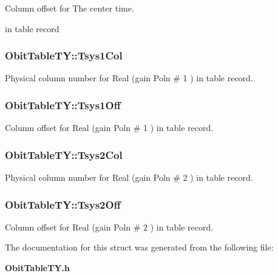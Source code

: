 Column offset for The center time. 

in table record 
\subsubsection{ {\bf Obit\-Table\-TY::Tsys1Col}}\label{structObitTableTY_o31}


Physical column number for Real (gain Poln \# 1 ) in table record. 

\subsubsection{ {\bf Obit\-Table\-TY::Tsys1Off}}\label{structObitTableTY_o30}


Column offset for Real (gain Poln \# 1 ) in table record. 

\subsubsection{ {\bf Obit\-Table\-TY::Tsys2Col}}\label{structObitTableTY_o35}


Physical column number for Real (gain Poln \# 2 ) in table record. 

\subsubsection{ {\bf Obit\-Table\-TY::Tsys2Off}}\label{structObitTableTY_o34}


Column offset for Real (gain Poln \# 2 ) in table record. 



The documentation for this struct was generated from the following file:\begin{CompactItemize}
\item 
{\bf Obit\-Table\-TY.h}\end{CompactItemize}
